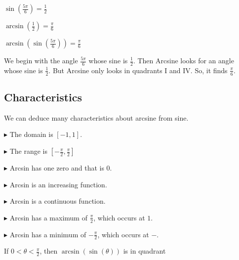 \documentclass{ximera}
\begin{document}
\begin{example}



$\sin\left(\frac{5\pi}{6}\right) = \frac{1}{2}$

$\arcsin\left(\frac{1}{2}\right) = \frac{\pi}{6}$


$\arcsin\left(\sin\left(\frac{5\pi}{6}\right)\right) = \frac{\pi}{6}$




We begin with the angle $\frac{5\pi}{6}$ whose sine is $\frac{1}{2}$.  Then Arcsine looks for an angle whose sine is $\frac{1}{2}$.  But Arcsine only looks in quadrants I and IV.  So, it finds $\frac{\pi}{6}$.


\end{example}









\subsection{Characteristics} 

We can deduce many characteristics about arcsine from sine.


$\blacktriangleright$ The domain is  $[-1, 1]$.


$\blacktriangleright$ The range is $\left[ -\frac{\pi}{2}, \frac{\pi}{2} \right]$


$\blacktriangleright$ Arcsin has one zero and that is $0$.


$\blacktriangleright$ Arcsin is an increasing function.

$\blacktriangleright$ Arcsin is a continuous function.

$\blacktriangleright$ Arcsin has a maximum of $\frac{\pi}{2}$, which occurs at $1$.

$\blacktriangleright$ Arcsin has a minimum of $-\frac{\pi}{2}$, which occurs at $-$.



\begin{question}


If $0 < \theta < \frac{\pi}{2}$, then $\arcsin(\sin(\theta))$ is in quadrant

\begin{multipleChoice}
\end{multipleChoice}

\end{question}
\end{document}
